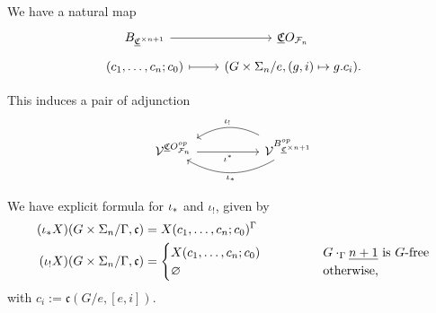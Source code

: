 \documentclass[a4paper,10pt
,draft
]{article}%
\newcommand{\UC}{\underline{\mathfrak C}}
\renewcommand{\F}{\mathcal F}
\renewcommand{\1}{\ensuremath{\mathbb{id}}}
\begin{document}
We have a natural map
\begin{equation}
      \begin{tikzcd}[row sep = tiny]
            B_{\UC^{\times n+1}} \arrow[r]
            &
            \UC O_{\F_n}
            \\
            (c_1,\dots,c_n;c_0) \arrow[r, mapsto]
            &
            (G \times \Sigma_n/e, (g,i) \mapsto g.c_i).
      \end{tikzcd}
\end{equation}

This induces a pair of adjunction
\begin{equation}
      \begin{tikzcd}[column sep =5em]
            \V^{\UC O_{\F_n}^{op}} \arrow[r, "\iota^{\**}"']
            &
            \V^{B_{\UC^{\times n+1}}^{op}}
            \arrow[l, bend right, "\iota_{!}"']
            \arrow[l, bend left, "\iota_{\**}"]
      \end{tikzcd}
\end{equation}

We have explicit formula for $\iota_{\**}$ and $\iota_!$, given by
\begin{align*}
  (\iota_{\**} X)(G \times \Sigma_n/\Gamma, \mathfrak c) &= X(c_1,\dots, c_n;c_0)^\Gamma\\
  (\iota_! X)(G \times \Sigma_n/\Gamma, \mathfrak c) &=
                                                       {\begin{cases}
                                                               X(c_1,\dots,c_n;c_0) \qquad \qquad & G \cdot_\Gamma \underline{n+1} \mbox{ is $G$-free} \\
                                                               \varnothing & \mbox{otherwise,}
                                                       \end{cases}}
\end{align*}
with  $c_i := \mathfrak c(G/e, [e, i])$.
\end{document}

